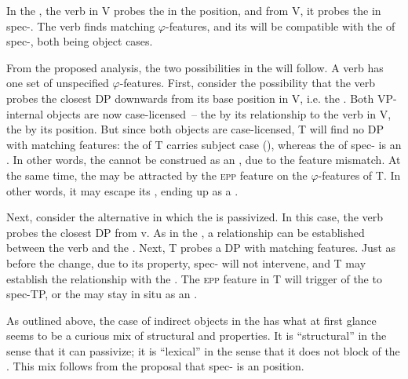 \documentclass[output=paper]{langscibook}
\begin{document}
In the , the verb in V probes the  in the  position, and from V, it probes the  in spec-. The verb finds matching $\varphi $-features, and its  will be compatible with the  of spec-, both being object cases.



From the proposed analysis, the two possibilities in the  will follow. A  verb has one set of unspecified $\varphi $-features. First, consider the possibility that the verb probes the closest DP downwards from its base position in V, i.e. the . Both VP-internal objects are now case-licensed~– the  by its relationship to the verb in V, the  by its position. But since both objects are case-licensed, T will find no DP with matching features: the  of T carries subject case (), whereas the  of spec- is an . In other words, the  cannot be construed as an , due to the feature mismatch. At the same time, the  may be attracted by the \textsc{epp} feature on the $\varphi $-features of T. In other words, it may escape its , ending up as a .



Next, consider the alternative in which the  is passivized. In this case, the verb probes the closest DP from v. As in the , a relationship can be established between the verb and the . Next, T probes a DP with matching features. Just as before the change, due to its  property, spec- will not intervene, and T may establish the  relationship with the . The \textsc{epp} feature in T will trigger  of the  to spec-TP, or the  may stay in situ as an .



As outlined above, the case of indirect objects in the  has what at first glance seems to be a curious mix of structural and  properties. It is “structural” in the sense that it can passivize; it is “lexical” in the sense that it does not block  of the . This mix follows from the proposal that spec- is an  position.
\end{document}
